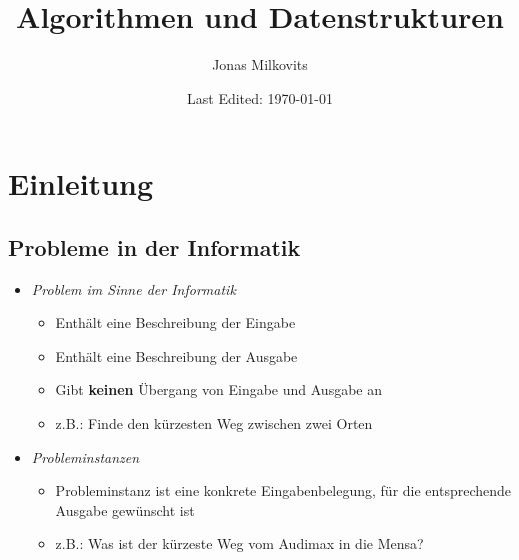 

\begin{titlepage}
  \title{Algorithmen und Datenstrukturen} %
  \author{Jonas Milkovits}
  \date{Last Edited: \today}
\end{titlepage}



\maketitle
{} %
\tableofcontents
\clearpage
{} %


\section{Einleitung}
\subsection{Probleme in der Informatik}
\begin{itemize} 
    \item \textit{Problem im Sinne der Informatik}
	    \begin{itemize}
          	\item Enthält eine Beschreibung der Eingabe 
          	\item Enthält eine Beschreibung der Ausgabe
          	\item Gibt \textbf{keinen} Übergang von Eingabe und Ausgabe an
          	\item z.B.: Finde den kürzesten Weg zwischen zwei Orten
	    \end{itemize}
	
    \item \textit{Probleminstanzen}
        \begin{itemize}
          	\item Probleminstanz ist eine konkrete Eingabenbelegung, für die entsprechende Ausgabe gewünscht ist
          	\item z.B.: Was ist der kürzeste Weg vom Audimax in die Mensa?
    	\end{itemize}

\end{itemize}

